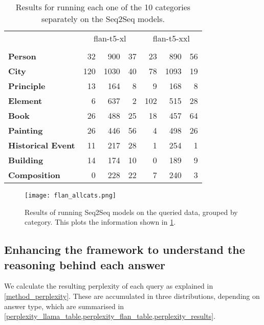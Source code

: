 \begin{table}[ht]
	\centering
	\footnotesize
	\begin{tabular}{>{\bfseries}l | r r r | r r r}
		\toprule
			& \multicolumn{3}{|c}{\ttfamily flan-t5-xl} & \multicolumn{3}{|c}{\ttfamily flan-t5-xxl} \\
			& \Parametric{} & \Contextual{} & \Other{} & \Parametric{} & \Contextual{} & \Other{} \\
		\midrule
			Person           &  32 &  900 & 37 &  23 &  890 & 56 \\
			City             & 120 & 1030 & 40 &  78 & 1093 & 19 \\
			Principle        &  13 &  164 &  8 &   9 &  168 &  8 \\
			Element          &   6 &  637 &  2 & 102 &  515 & 28 \\
			Book             &  26 &  488 & 25 &  18 &  457 & 64 \\
			Painting         &  26 &  446 & 56 &   4 &  498 & 26 \\
			Historical Event &  11 &  217 & 28 &   1 &  254 &  1 \\
			Building         &  14 &  174 & 10 &   0 &  189 &  9 \\
			Composition      &   0 &  228 & 22 &   7 &  240 &  3 \\
		\bottomrule
	\end{tabular}
	\caption{Results for running each one of the 10 categories separately on the Seq2Seq models.}
	\label{flan_cats_table}
\end{table}

\begin{figure}[p]
	\centering
	\texttt{[image: flan\_allcats.png]}
	\caption{Results of running Seq2Seq models on the queried data, grouped by category. This plots the information shown in \cref{flan_cats_table}.}
	\label{flan_cats_result}
\end{figure}


\subsection{Enhancing the framework to understand the reasoning behind each answer}
\label{results_perplexity_score}

We calculate the resulting perplexity of each query as explained in \cref{method_perplexity}.
These are accumulated in three distributions, depending on answer type, which are summarised in \cref{perplexity_llama_table,perplexity_flan_table,perplexity_results}.

